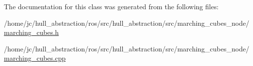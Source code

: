 The documentation for this class was generated from the following files\+:\begin{DoxyCompactItemize}
\item 
/home/jc/hull\+\_\+abstraction/ros/src/hull\+\_\+abstraction/src/marching\+\_\+cubes\+\_\+node/\hyperlink{marching__cubes_8h}{marching\+\_\+cubes.\+h}\item 
/home/jc/hull\+\_\+abstraction/ros/src/hull\+\_\+abstraction/src/marching\+\_\+cubes\+\_\+node/\hyperlink{marching__cubes_8cpp}{marching\+\_\+cubes.\+cpp}\end{DoxyCompactItemize}

